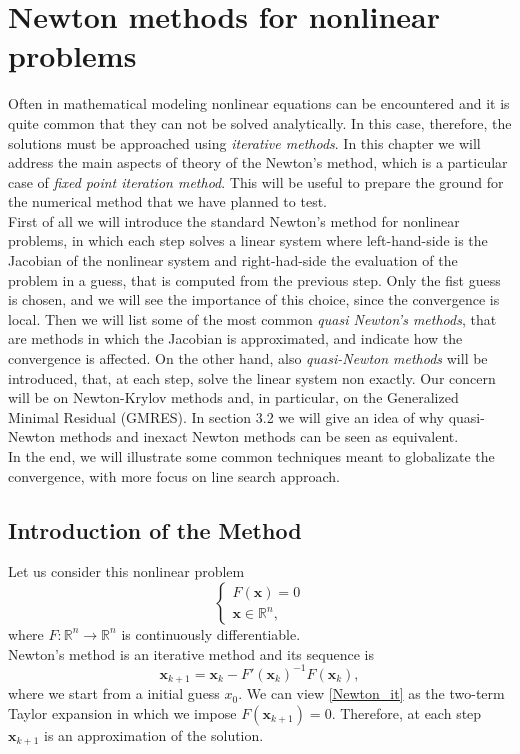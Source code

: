 \chapter{Newton methods for nonlinear problems}
Often in mathematical modeling nonlinear equations can be encountered and it is quite common that they can not be solved analytically. In this case, therefore, the solutions must be approached using \textit{iterative methods}.
In this chapter we will address the main aspects of theory of the Newton's method, which is a particular case of \textit{fixed point iteration method}. This will be useful to prepare the ground for the numerical method that we have planned to test. \\
First of all we will introduce the standard Newton's method for nonlinear problems, in which each step solves a linear system where left-hand-side is the Jacobian of the nonlinear system and right-had-side the evaluation of the problem in a guess, that is computed from the previous step. Only the fist guess is chosen, and we will see the importance of this choice, since the convergence is local. Then we will list some of the most common \textit{quasi Newton's methods}, that are methods in which the Jacobian is approximated, and indicate how the convergence is affected. On the other hand, also \textit{quasi-Newton methods} will be introduced, that, at each step, solve the linear system non exactly. Our concern will be on Newton-Krylov methods and, in particular, on the Generalized Minimal Residual (GMRES). In section 3.2 we will give an idea of why quasi-Newton methods and inexact Newton methods can be seen as equivalent. \\
In the end, we will illustrate some common techniques meant to globalizate the convergence, with more focus on line search approach. 
 
\section{Introduction of the Method}
Let us consider this nonlinear problem 
\begin{equation*}
\begin{cases}
F(\textbf{x}) = 0\\\textbf{x} \in \mathbb{R}^n,
\end{cases}
\end{equation*}
where $F: \mathbb{R}^{n} \rightarrow \mathbb{R}^{n}$ is continuously differentiable.\\
Newton's method is an iterative method and its sequence is
\begin{equation}
{\textbf{x}}_{k+1} = {\textbf{x}}_{k} - F'({\textbf{x}}_{k})^{-1} F({\textbf{x}}_{k}), 
\label{Newton_it}
\end{equation}
where we start from a initial guess ${x}_{0}$. We can view \eqref{Newton_it} as the two-term Taylor expansion in which we impose $F({\textbf{x}}_{k+1})=0$.  Therefore, at each step $ \textbf{x}_{k+1} $ is an approximation of the solution.\\

